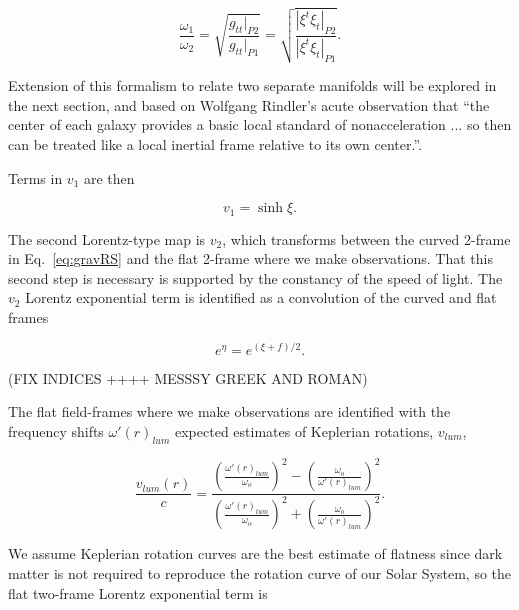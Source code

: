 \documentclass[reprint,%
 amsmath,amssymb,
 aps,
]{revtex4-1}
\begin{document}
 
 
  
   
   \begin{equation}
       \frac{\omega_1}{\omega_2}  =\sqrt{\frac{g_{tt}|_{P2}}{g_{tt}|_{P1}}} =\sqrt{\frac{|\xi^t\xi_{t}|_{P2}}{|\xi^t\xi_{t}|_{P1}}}. 
      \label{eq:grav}
    \end{equation}
    
   Extension of this formalism to relate two separate manifolds will be explored in the next section, and based on Wolfgang Rindler's acute observation  that    ``the center of each galaxy provides a basic local standard of nonacceleration ... so then can be treated like a local inertial frame relative to its own center.''\cite{rindler2013essential}.




    
 Terms in $v_1$   are then 
 
   \begin{equation}
       v_1 = \sinh \xi. 
   \end{equation}
 
 

The second Lorentz-type map is $v_2$, which transforms between the  curved 2-frame in Eq.~\ref{eq:gravRS} and  the flat 2-frame where we make observations. That this second step is necessary is supported by the constancy of the speed of light.   
The   $v_2$   Lorentz exponential term  is identified as a convolution of the curved and flat frames
 
\begin{equation}
    e^{\eta}=   e^{(\xi+f)/2}.
\end{equation}

 (FIX INDICES ++++ MESSSY GREEK AND ROMAN)

The flat field-frames where we make observations  are identified with the frequency shifts $\omega'(r)_{lum}$ expected  estimates of   Keplerian rotations, $v_{lum}$,   

 
 \begin{equation}
 \frac{v_{lum}(r) }{c}=
\frac{  \left( \frac{\omega'(r)_{lum}}{\omega_o}\right)^2 -  \left( \frac{\omega_o}{\omega'(r)_{lum}} \right)^2 }{  \left( \frac{\omega'(r)_{lum}}{\omega_o}\right)^2  +  \left( \frac{\omega_o}{\omega'(r)_{lum}}\right)^2 }. 
\label{eq:lumlorentz}
\end{equation} 
 
 
  We assume Keplerian rotation curves are     the best estimate of flatness since dark matter is not required to  reproduce the rotation curve of our Solar System, so 
the flat two-frame Lorentz exponential term is 
\end{document}

